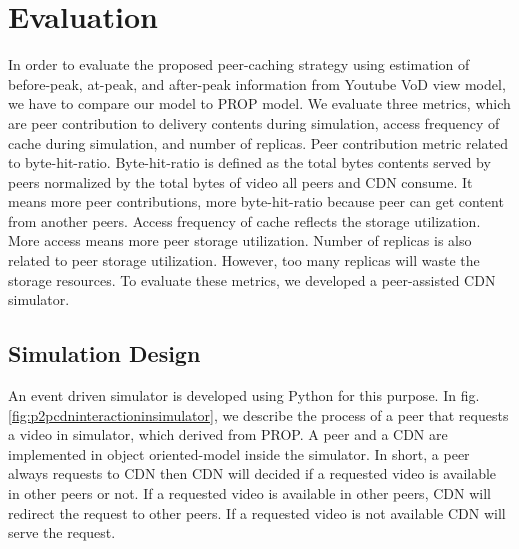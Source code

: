 \section{Evaluation}\label{evaluation}
In order to evaluate the proposed peer-caching strategy using estimation of before-peak, at-peak, and after-peak information from Youtube VoD view model, we have to compare our model to PROP model.
We evaluate three metrics, which are peer contribution to delivery contents during simulation,  access frequency of cache during simulation, and number of replicas. 
Peer contribution metric related to byte-hit-ratio. 
Byte-hit-ratio is defined as the total bytes contents served by peers normalized by the total bytes of video all peers and CDN consume.
It means more peer contributions, more byte-hit-ratio because peer can get content from another peers. 
Access frequency of cache reflects the storage utilization. 
More access means more peer storage utilization.  
Number of replicas is also related to peer storage utilization.  
However, too many replicas will waste the storage resources.
To evaluate these metrics, we developed a peer-assisted CDN simulator. 


\subsection{Simulation Design}\label{simulationdesign}
An event driven simulator is developed using Python for this purpose.
In fig.\ref{fig:p2pcdninteractioninsimulator}, we describe the process of a peer that requests a video in simulator, which derived from PROP.
A peer and a CDN are implemented in object oriented-model inside the simulator. 
In short, a peer always requests to CDN then CDN will decided if a requested video is available in other peers or not. 
If a requested video is available in other peers, CDN will redirect the request to other peers.
If a requested video is not available CDN will serve the request.


